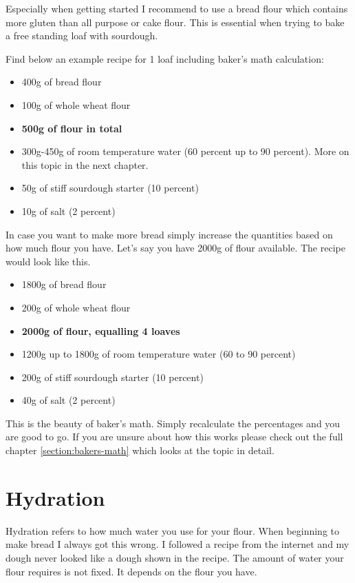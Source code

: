 Especially when getting started I recommend to use a bread flour which
contains more gluten than all purpose or cake flour. This is essential
when trying to bake a free standing loaf with sourdough.

Find below an example recipe for 1 loaf including baker's math calculation:

\begin{itemize}
  \item 400g of bread flour
  \item 100g of whole wheat flour
  \item \textbf{500g of flour in total}
  \item 300g-450g of room temperature water (60 percent up to 90 percent). More on
this topic in the next chapter.
  \item 50g of stiff sourdough starter (10 percent)
  \item 10g of salt (2 percent)
\end{itemize}

In case you want to make more bread simply increase the quantities based on
how much flour you have. Let's say you have 2000g of flour available. The
recipe would look like this.

\begin{itemize}
  \item 1800g of bread flour
  \item 200g of whole wheat flour
  \item \textbf{2000g of flour, equalling 4 loaves}
  \item 1200g up to 1800g of room temperature water (60 to 90 percent)
  \item 200g of stiff sourdough starter (10 percent)
  \item 40g of salt (2 percent)
\end{itemize}

This is the beauty of baker's math. Simply recalculate the percentages and you
are good to go. If you are unsure about how this works please check out the
full chapter \ref{section:bakers-math} which looks at the topic in detail.

\section{Hydration}

Hydration refers to how much water you use for your flour. When
beginning to make bread I always got this wrong. I followed a recipe from the
internet and my dough never looked like a dough shown in the recipe.
The amount of water your flour requires is not fixed. It depends on the flour
you have.

